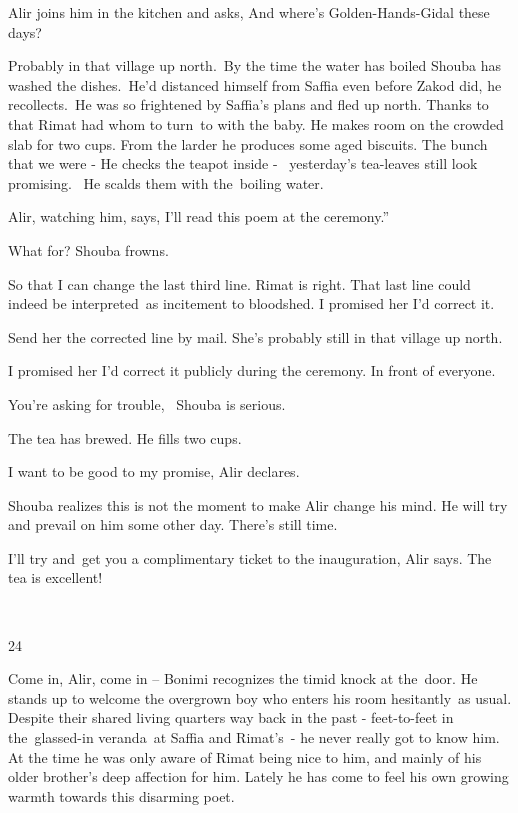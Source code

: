 \documentclass[letterpaper]{article}
\begin{document}
Alir joins him in the kitchen and asks, {\textquotedbl}And where's Golden-Hands-Gidal these days?{\textquotedbl} 

{\textquotedbl}Probably in that village up north.{\textquotedbl}\ By the time the water has boiled Shouba has washed the
dishes.\ {\textquotedbl}He'd distanced himself from Saffia even before Zakod did,{\textquotedbl} he
recollects.\ {\textquotedbl}He was so frightened by Saffia's plans and fled up north. Thanks to that Rimat had whom to
turn~to with the baby.{\textquotedbl} He makes room on the crowded slab for two cups. From the larder he produces some
aged biscuits. {\textquotedbl}The bunch that we were -{\textquotedbl} He checks the teapot inside - \ yesterday's
tea-leaves still look promising. ~He scalds them with the\ boiling water.

Alir, watching him, says, {\textquotedbl}I'll read this poem at the ceremony.''~ 

{\textquotedbl}What for?{\textquotedbl} Shouba frowns.\ \ 

{\textquotedbl}So that I can change the last third line. Rimat is right. That last line could indeed be interpreted~as
incitement to bloodshed. I promised her I'd correct it.{\textquotedbl} 

{\textquotedbl}Send her the corrected line by mail. She's probably still in that village up north.{\textquotedbl} 

{\textquotedbl}I promised her I'd correct it publicly during the ceremony. In front of everyone.{\textquotedbl}~ 

{\textquotedbl}You're asking for trouble,\ {\textquotedbl} Shouba is serious.

The tea has brewed. He fills two cups. 

{\textquotedbl}I want to be good to my promise,{\textquotedbl} Alir declares.

Shouba realizes this is not the moment to make Alir change his mind. He will try and prevail on him some other day.
There's still time. 

{\textquotedbl}I'll try and~get you a complimentary ticket to the inauguration,{\textquotedbl} Alir says.
{\textquotedbl}The tea is excellent!{\textquotedbl}

~

24~

{\textquotedbl}Come in, Alir, come in -- {\textquotedbl} Bonimi recognizes the timid knock at the~door. He stands up to
welcome the overgrown boy who enters his room hesitantly\ as usual. Despite their shared living quarters way back in
the past - feet-to-feet in the\ glassed-in veranda~at Saffia and Rimat's\textcolor{red}{\ }{}- he never really got to
know him. At the time he was only aware of Rimat being nice to him, and mainly of his older brother's deep affection
for him. Lately he has come to feel his own growing warmth towards this disarming poet. 
\end{document}
